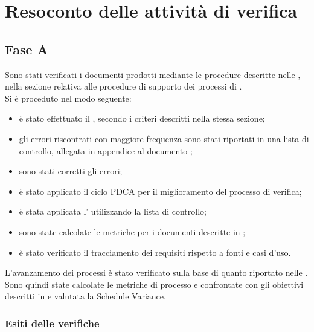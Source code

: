 \section{Resoconto delle attività di verifica}\label{app:resoconto_verifica}
\subsection{Fase A}
Sono stati verificati i documenti prodotti mediante le procedure descritte nelle \NormeDiProgetto{}, nella sezione relativa alle procedure di supporto dei processi di \VV{}.\\
Si è proceduto nel modo seguente:\begin{itemize}
	\item è stato effettuato il , secondo i criteri descritti nella stessa sezione;
	\item gli errori riscontrati con maggiore frequenza sono stati riportati in una lista di controllo, allegata in appendice al documento \NormeDiProgetto{};
	\item sono stati corretti gli errori;
	\item è stato applicato il ciclo PDCA per il miglioramento del processo di verifica;
	\item è stata applicata l' utilizzando la lista di controllo;
	\item sono state calcolate le metriche per i documenti descritte in \NormeDiProgetto{};
	\item è stato verificato il tracciamento dei requisiti rispetto a fonti e casi d'uso.
\end{itemize}
L'avanzamento dei processi è stato verificato sulla base di quanto riportato nelle \NormeDiProgetto{}. Sono quindi state calcolate le metriche di processo e confrontate con gli obiettivi descritti in  e valutata la Schedule Variance.

\subsubsection{Esiti delle verifiche}
